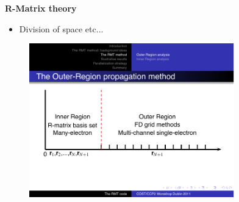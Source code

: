 \documentclass{fancyslides}
\newlength{\wideitemsep}
\let\olditem\item
\renewcommand{\item}{\setlength{\itemsep}{\wideitemsep}\olditem}
\begin{document}
\begin{frame}

\begin{center}
{\bf\large R-Matrix theory}
\end{center}
\begin{itemize}
\item
Division of space etc...
\end{itemize}
\vspace{-0.2in}


\begin{figure}[h]
\centering\includegraphics[width=3.5in]{space.pdf}%
\end{figure}

\end{frame}
\end{document}
